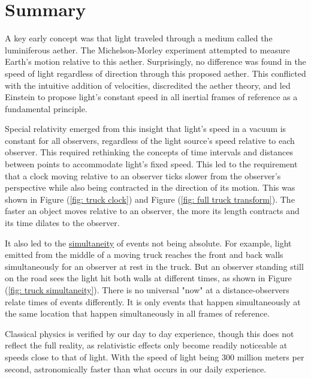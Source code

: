 \section{Summary}

A key early concept was that light traveled through a medium called the luminiferous aether.
The Michelson-Morley experiment attempted to measure Earth's motion relative to this aether.
Surprisingly, no difference was found in the speed of light regardless of direction through this proposed aether.
This conflicted with the intuitive addition of velocities, discredited the aether theory, and led Einstein to propose light's constant speed in all inertial frames of reference as a fundamental principle.

Special relativity emerged from this insight that light's speed in a vacuum is constant for all observers, regardless of the light source's speed relative to each observer.
This required rethinking the concepts of time intervals and distances between points to accommodate light's fixed speed.
This led to the requirement that a clock moving relative to an observer ticks slower from the observer's perspective while also being contracted in the direction of its motion.
This was shown in Figure (\ref{fig: truck clock}) and Figure (\ref{fig: full truck transform}).
The faster an object moves relative to an observer, the more its length contracts and its time dilates to the observer.

It also led to the \hyperlink{def-simultaneity}{simultaneity} of events not being absolute.
For example, light emitted from the middle of a moving truck reaches the front and back walls simultaneously for an observer at rest in the truck.
But an observer standing still on the road sees the light hit both walls at different times, as shown in Figure (\ref{fig: truck simultaneity}).
There is no universal "now" at a distance-observers relate times of events differently.
It is only events that happen simultaneously at the same location that happen simultaneously in all frames of reference.

Classical physics is verified by our day to day experience, though this does not reflect the full reality, as relativistic effects only become readily noticeable at speeds close to that of light.
With the speed of light being 300 million meters per second, astronomically faster than what occurs in our daily experience.

